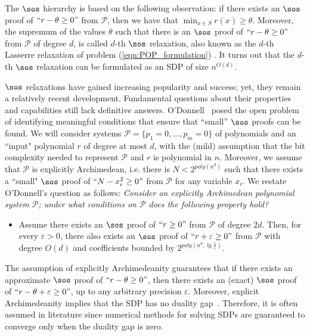 \documentclass[11pt]{article}
\begin{document}
The $\sos$ hierarchy is based on the following observation: if there exists an $\sos$ proof of $`` r - \theta \geq 0"$ from $\mathcal{P}$, then we have that $\min_{x \in S} r(x) \geq \theta$. Moreover, the supremum of the values $\theta$ such that there is an $\sos$ proof of $``r - \theta \geq 0"$ from $\mathcal{P}$ of degree $d$, is called $d$-th $\sos$ relaxation, also known as the $d$-th Lasserre relaxation of problem (\ref{eqn:POP_formulation}) \cite{Lasserre2001,Parrilo03}. It turns out that the $d$-th  $\sos$ relaxation can be formulated as an SDP of size $n^{O(d)}$.

\(\sos\) relaxations have gained increasing popularity and success; yet, they remain a relatively recent development. Fundamental questions about their properties and capabilities still lack definitive answers. %
O'Donnell~\cite{odonnell2017} posed the open problem of identifying meaningful conditions that ensure that “small” \(\sos\) proofs can be found. We will consider systems $\mathcal{P} = \{p_1 = 0,\ldots,p_m = 0\}$ of polynomials and an ``input" polynomial $r$ of degree at most $d$, with the (mild) assumption that the bit complexity needed to represent $\mathcal{P}$ and $r$ is polynomial in $n$. Moreover, we assume that $\mathcal{P}$ is explicitly Archimedean, i.e. there is $N<2^{poly(n^d)}$ such that there exists a ``small" $\sos$ proof of $``N - x_i^2 \geq 0"$ from $\mathcal{P}$ for any variable $x_i$.
We restate O'Donnell's question as follows: \emph{Consider an explicitly Archimedean polynomial system \(\mathcal{P}\); under what conditions on $\mathcal{P}$ does the following property hold?}
%
\begin{itemize}[label=$(\rm{P})$]
    \item Assume there exists an $\sos$ proof of $``r \geq 0"$ from $\mathcal{P}$ of degree $2d$. Then, for every $\varepsilon>0$, there also exists an $\sos$ proof of $``r +\varepsilon \geq 0"$ from $\mathcal{P}$ with degree $O(d)$ and coefficients bounded by $2^{poly(n^d,\lg \frac{1}{\varepsilon})}$.
\end{itemize}

The assumption of explicitly Archimedeanity guarantees that if there exists an approximate $\sos$ proof of $``r - \theta \geq 0"$, then there exists an (exact) $\sos$ proof of $``r - \theta + \varepsilon \geq 0"$, up to any arbitrary precision $\varepsilon$.
Moreover, explicit Archimedeanity implies that the SDP has no duality gap~\cite{JoszH16}. Therefore, it is often assumed in literature since numerical methods for solving SDPs are guaranteed to converge only when the duality gap is zero.
\end{document}
